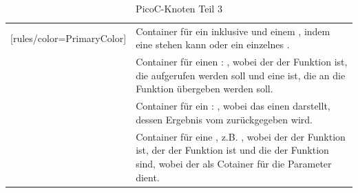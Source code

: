 \begin{table}[H]
\begin{NiceTabular}{X[7]X[10]}[rules/color=PrimaryColor]
   & Container für ein   inklusive     und einem   , indem eine  stehen kann oder ein einzelnes . \\
   & Container für einen : , wobei  der  der Funktion ist, die aufgerufen werden soll und  eine  ist, die an die Funktion übergeben werden soll. \\
   & Container für ein : , wobei das     einen   darstellt, dessen Ergebnis vom   zurückgegeben wird. \\
   & Container für eine , z.B. , wobei  der   der Funktion ist,   der   der Funktion ist und  die  der Funktion sind, wobei der   als Cotainer für die Parameter dient. \\
  \bottomrule
\end{NiceTabular}
\caption{PicoC-Knoten Teil 3}
\label{tab:picoc_knoten_teil_3}
\end{table}

